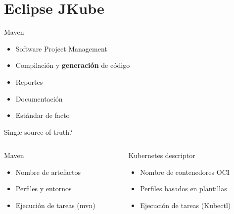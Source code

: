 \documentclass[aspectratio=169]{beamer}
\begin{document}
{
	\section{Eclipse JKube}
}


\begin{frame}[fragile]{Maven}

           	\begin{itemize}
           		\item Software Project Management
           		\item Compilación y \textbf{generación} de código
           		\item Reportes
           		\item Documentación
                \item Estándar de facto
           	\end{itemize}

\end{frame}

\begin{frame}[fragile]{Single source of truth?}
    \begin{columns}
        \begin{column}{0.5\textwidth}
        Maven
           	\begin{itemize}
           		\item Nombre de artefactos
           		\item Perfiles y entornos
           		\item Ejecución de tareas (mvn)
           	\end{itemize}
        \end{column}
        \begin{column}{0.5\textwidth}  %
        Kubernetes descriptor
          \begin{itemize}
    		\item Nombre de contenedores OCI
       		\item Perfiles basados en plantillas
       		\item Ejecución de tareas (Kubectl)
        	\end{itemize}
        \end{column}
    \end{columns}
\end{frame}
\end{document}
